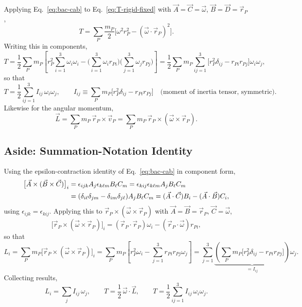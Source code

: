 \documentclass[11pt]{article}
\begin{document}
Applying Eq.~\eqref{eq:bac-cab} to Eq.~\eqref{eq:T-rigid-fixed} with $\vec A=\vec C=\vec\omega$, $\vec B=\vec D=\vec r_P$,
\begin{equation}
T = \sum_P\frac{m_P}{2}\Big[\omega^2 r_P^2-(\vec\omega\cdot\vec r_P)^2\Big].
\label{eq:T-expand1}
\end{equation}
Writing this in components,
\begin{equation}
T = \frac12\sum_P m_P\left[r_P^2\sum_{i=1}^3\omega_i\omega_i - \Big(\sum_{i=1}^3\omega_ir_{Pi}\Big)\Big(\sum_{j=1}^3\omega_jr_{Pj}\Big)\right]
= \frac12\sum_P m_P\sum_{ij=1}^3\Big[r_P^2\delta_{ij}-r_{Pi}r_{Pj}\Big]\omega_i\omega_j,
\label{eq:T-component}
\end{equation}
so that
\begin{equation}
\boxed{T = \frac12\sum_{ij=1}^3 I_{ij}\,\omega_i\omega_j,} \qquad
\boxed{I_{ij}\equiv\sum_P m_P\Big[r_P^2\delta_{ij}-r_{Pi}r_{Pj}\Big]} \quad \text{(moment of inertia tensor, symmetric).}
\label{eq:inertia-tensor-def}
\end{equation}
Likewise for the angular momentum,
\begin{equation}
\vec L = \sum_P m_P\,\vec r_P\times\vec v_P = \sum_P m_P\,\vec r_P\times(\vec\omega\times\vec r_P).
\label{eq:L-rigid}
\end{equation}

\subsection*{Aside: Summation-Notation Identity}

Using the epsilon-contraction identity of Eq.~\eqref{eq:bac-cab} in component form,
\begin{align}
\big[\vec A\times(\vec B\times\vec C)\big]_i &= \epsilon_{ijk}A_j\epsilon_{k\ell m}B_\ell C_m = \epsilon_{kij}\epsilon_{k\ell m}A_jB_\ell C_m\notag\\
&= (\delta_{i\ell}\delta_{jm}-\delta_{im}\delta_{j\ell})A_jB_\ell C_m = (\vec A\cdot\vec C)B_i - (\vec A\cdot\vec B)C_i,
\label{eq:aside-bac-cab}
\end{align}
using $\epsilon_{ijk}=\epsilon_{kij}$. Applying this to $\vec r_P\times(\vec\omega\times\vec r_P)$ with $\vec A=\vec B=\vec r_P$, $\vec C=\vec\omega$,
\begin{equation}
\big[\vec r_P\times(\vec\omega\times\vec r_P)\big]_i = (\vec r_P\cdot\vec r_P)\omega_i - (\vec r_P\cdot\vec\omega)r_{Pi},
\label{eq:rxwr}
\end{equation}
so that
\begin{equation}
L_i = \sum_P m_P\big[\vec r_P\times(\vec\omega\times\vec r_P)\big]_i = \sum_P m_P\left[r_P^2\omega_i - \sum_{j=1}^3 r_{Pi}r_{Pj}\omega_j\right]
= \sum_{j=1}^3\underbrace{\left(\sum_P m_P\big[r_P^2\delta_{ij}-r_{Pi}r_{Pj}\big]\right)}_{=I_{ij}}\omega_j.
\label{eq:Li-derivation}
\end{equation}
Collecting results,
\begin{equation}
\boxed{L_i = \sum_j I_{ij}\,\omega_j,} \qquad \boxed{T = \frac12\,\vec\omega\cdot\vec L,} \qquad \boxed{T = \frac12\sum_{ij=1}^3 I_{ij}\,\omega_i\omega_j.}
\label{eq:L-T-boxed}
\end{equation}
\end{document}
